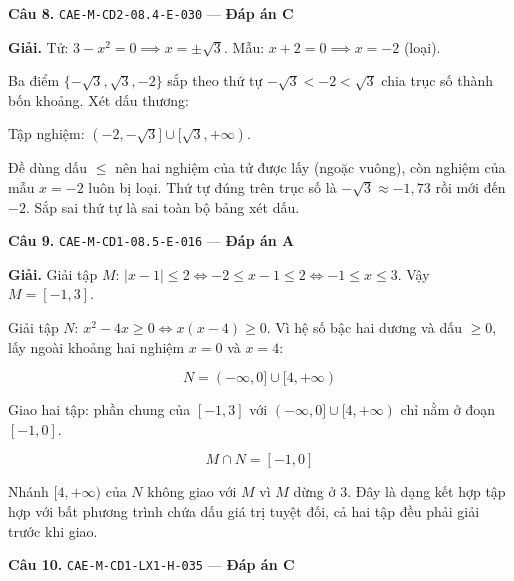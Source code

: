 \documentclass[11pt, a4paper]{article}
\begin{document}
\textbf{Câu 8.} \texttt{CAE-M-CD2-08.4-E-030} — \textbf{Đáp án C}

\textbf{Giải.} Tử: $3 - x^2 = 0 \implies x = \pm\sqrt{3}$. Mẫu: $x + 2 = 0 \implies x = -2$ (loại).

Ba điểm $\{-\sqrt{3}, \sqrt{3}, -2\}$ sắp theo thứ tự $-\sqrt{3} < -2 < \sqrt{3}$ chia trục số thành bốn khoảng. Xét dấu thương:


Tập nghiệm: $(-2, -\sqrt{3}] \cup [\sqrt{3}, +\infty)$.

 Đề dùng dấu $\le$ nên hai nghiệm của tử được lấy (ngoặc vuông), còn nghiệm của mẫu $x = -2$ luôn bị loại. Thứ tự đúng trên trục số là $-\sqrt{3} \approx -1{,}73$ rồi mới đến $-2$. Sắp sai thứ tự là sai toàn bộ bảng xét dấu.

\textbf{Câu 9.} \texttt{CAE-M-CD1-08.5-E-016} — \textbf{Đáp án A}

\textbf{Giải.} Giải tập $M$: $|x - 1| \le 2 \iff -2 \le x - 1 \le 2 \iff -1 \le x \le 3$. Vậy $M = [-1, 3]$.

Giải tập $N$: $x^2 - 4x \ge 0 \iff x(x-4) \ge 0$. Vì hệ số bậc hai dương và dấu $\ge 0$, lấy ngoài khoảng hai nghiệm $x = 0$ và $x = 4$:

$$N = (-\infty, 0] \cup [4, +\infty)$$

Giao hai tập: phần chung của $[-1, 3]$ với $(-\infty, 0] \cup [4, +\infty)$ chỉ nằm ở đoạn $[-1, 0]$.

$$M \cap N = [-1, 0]$$

 Nhánh $[4, +\infty)$ của $N$ không giao với $M$ vì $M$ dừng ở $3$. Đây là dạng kết hợp tập hợp với bất phương trình chứa dấu giá trị tuyệt đối, cả hai tập đều phải giải trước khi giao.

\textbf{Câu 10.} \texttt{CAE-M-CD1-LX1-H-035} — \textbf{Đáp án C}
\end{document}
